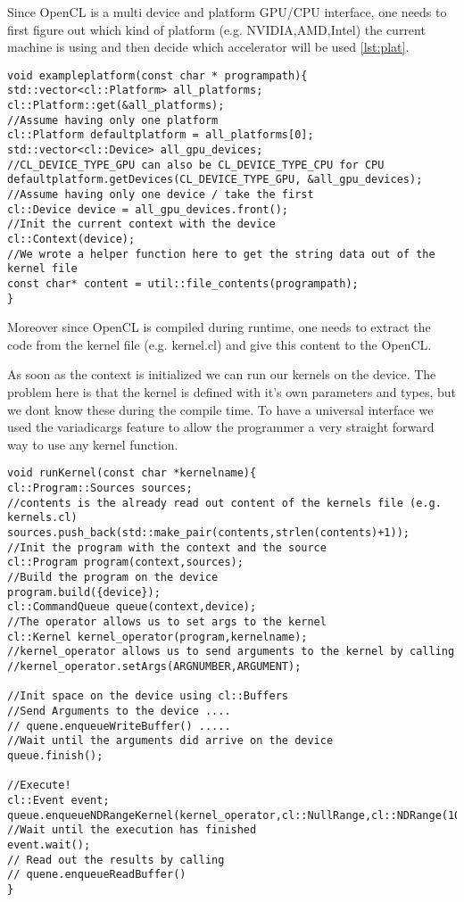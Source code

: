 Since OpenCL is a multi device and platform GPU/CPU interface, one needs to first figure out which kind of platform (e.g. NVIDIA,AMD,Intel) the current machine is using and then decide which accelerator will be used \ref{lst:plat}.

\label{lst:plat}
\begin{lstlisting}[caption=Get Platforms and devices]
void exampleplatform(const char * programpath){
std::vector<cl::Platform> all_platforms;
cl::Platform::get(&all_platforms);
//Assume having only one platform
cl::Platform defaultplatform = all_platforms[0];
std::vector<cl::Device> all_gpu_devices;
//CL_DEVICE_TYPE_GPU can also be CL_DEVICE_TYPE_CPU for CPU
defaultplatform.getDevices(CL_DEVICE_TYPE_GPU, &all_gpu_devices);
//Assume having only one device / take the first
cl::Device device = all_gpu_devices.front();
//Init the current context with the device
cl::Context(device);
//We wrote a helper function here to get the string data out of the kernel file
const char* content = util::file_contents(programpath);
}
\end{lstlisting}


Moreover since OpenCL is compiled during runtime, one needs to extract the code from the kernel file (e.g. kernel.cl) and give this content to the OpenCL.

As soon as the context is initialized we can run our kernels on the device. The problem here is that the kernel is defined with it's own parameters and types, but we dont know these during the compile time.
To have a universal interface we used the variadicargs feature to allow the programmer a very straight forward way to use any kernel function.
\label{lst:kernel}
\begin{lstlisting}[caption=Kernel usage]
void runKernel(const char *kernelname){
cl::Program::Sources sources;
//contents is the already read out content of the kernels file (e.g. kernels.cl)
sources.push_back(std::make_pair(contents,strlen(contents)+1));
//Init the program with the context and the source
cl::Program program(context,sources);
//Build the program on the device
program.build({device});
cl::CommandQueue queue(context,device);
//The operator allows us to set args to the kernel 
cl::Kernel kernel_operator(program,kernelname);
//kernel_operator allows us to send arguments to the kernel by calling
//kernel_operator.setArgs(ARGNUMBER,ARGUMENT);

//Init space on the device using cl::Buffers
//Send Arguments to the device ....
// quene.enqueueWriteBuffer() .....
//Wait until the arguments did arrive on the device
queue.finish();

//Execute!
cl::Event event;
queue.enqueueNDRangeKernel(kernel_operator,cl::NullRange,cl::NDRange(10),cl::NullRange,NULL,&event);
//Wait until the execution has finished
event.wait();
// Read out the results by calling 
// quene.enqueueReadBuffer()
}
\end{lstlisting}

